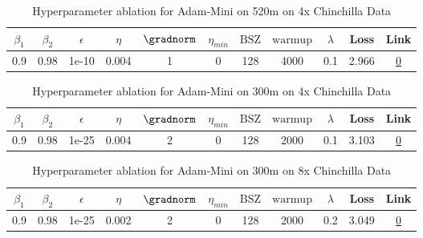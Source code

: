 \begin{table}[H]
\centering
\caption{Hyperparameter ablation for Adam-Mini on 520m on 4x Chinchilla Data}
\label{tab:ablation_adam-mini_520m_4}
\begin{tabular}{ccccccccccc}
\toprule
$\beta_1$ & $\beta_2$ & $\epsilon$ & $\eta$ & $\gradnorm$ & $\eta_{min}$ & $\mathrm{BSZ}$ & $\mathrm{warmup}$ & $\lambda$ & Loss & Link \\
\midrule
0.9 & 0.98 & 1e-10 & 0.004 & 1 & 0 & 128 & 4000 & 0.1 & 2.966 & \href{https://wandb.ai/stanford-mercury/optimizer-scaling/runs/sweep-520m-42B-minikdfe5aclr0.004-wd0.1-minlr0-warmup4000-b10.9--5de7af}{0} \\
\midrule
\bottomrule
\end{tabular}
\end{table}

\begin{table}[H]
\centering
\caption{Hyperparameter ablation for Adam-Mini on 300m on 4x Chinchilla Data}
\label{tab:ablation_adam-mini_300m_4}
\begin{tabular}{ccccccccccc}
\toprule
$\beta_1$ & $\beta_2$ & $\epsilon$ & $\eta$ & $\gradnorm$ & $\eta_{min}$ & $\mathrm{BSZ}$ & $\mathrm{warmup}$ & $\lambda$ & Loss & Link \\
\midrule
0.9 & 0.98 & 1e-25 & 0.004 & 2 & 0 & 128 & 2000 & 0.1 & 3.103 & \href{https://wandb.ai/stanford-mercury/optimizer-scaling/runs/sweep-300m-24B-mini09d394lr0.004-wd0.1-minlr0-warmup2000-b10.9-b-4e8de7}{0} \\
\midrule
\bottomrule
\end{tabular}
\end{table}

\begin{table}[H]
\centering
\caption{Hyperparameter ablation for Adam-Mini on 300m on 8x Chinchilla Data}
\label{tab:ablation_adam-mini_300m_8}
\begin{tabular}{ccccccccccc}
\toprule
$\beta_1$ & $\beta_2$ & $\epsilon$ & $\eta$ & $\gradnorm$ & $\eta_{min}$ & $\mathrm{BSZ}$ & $\mathrm{warmup}$ & $\lambda$ & Loss & Link \\
\midrule
0.9 & 0.98 & 1e-25 & 0.002 & 2 & 0 & 128 & 2000 & 0.2 & 3.049 & \href{https://wandb.ai/stanford-mercury/optimizer-scaling/runs/sweep-300m-48B-minic8695flr0.002-wd0.2-minlr0-warmup2000-b10.9-b-952cc4}{0} \\
\midrule
\bottomrule
\end{tabular}
\end{table}

